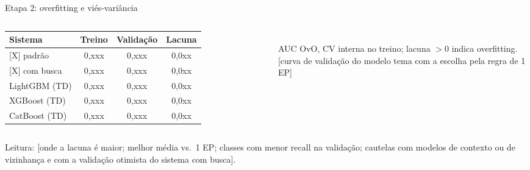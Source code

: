 \documentclass[aspectratio=169,11pt]{beamer}
\begin{document}
\begin{frame}{Etapa 2: overfitting e viés-variância}
    \begin{columns}[T,onlytextwidth]
        \footnotesize
        \begin{tabular}{l c c c}
            \toprule
            \textbf{Sistema} & \textbf{Treino} & \textbf{Validação} & \textbf{Lacuna} \\
            \midrule
            {}[X] padrão    & 0,xxx & 0,xxx & 0,0xx \\
            {}[X] com busca & 0,xxx & 0,xxx & 0,0xx \\
            LightGBM (TD)   & 0,xxx & 0,xxx & 0,0xx \\
            XGBoost (TD)    & 0,xxx & 0,xxx & 0,0xx \\
            CatBoost (TD)   & 0,xxx & 0,xxx & 0,0xx \\
            \bottomrule
        \end{tabular}
        \\[0.4em]
        AUC OvO, CV interna no treino; lacuna $> 0$ indica overfitting.
        \centering
        [curva de validação do modelo tema com a escolha pela regra de 1 EP]
    \end{columns}
    \vspace{0.4em}
    \footnotesize Leitura: [onde a lacuna é maior; melhor média vs.\ 1 EP; classes com menor recall na validação; cautelas com modelos de contexto ou de vizinhança e com a validação otimista do sistema com busca].
\end{frame}
\end{document}
